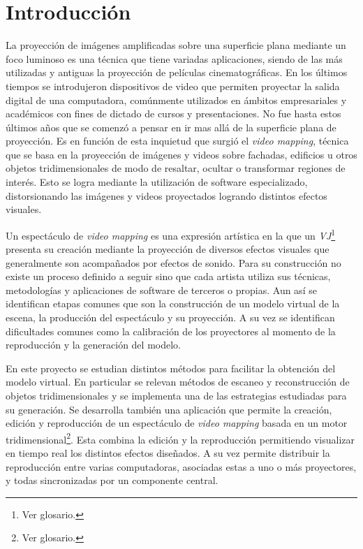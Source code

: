 ﻿\chapter{Introducción}


La proyección de imágenes amplificadas sobre una superficie plana mediante un foco luminoso es una técnica que tiene variadas aplicaciones, siendo de las más utilizadas y antiguas la proyección de películas cinematográficas. En los últimos tiempos se introdujeron dispositivos de video que permiten proyectar la salida digital de una computadora, comúnmente utilizados en ámbitos empresariales y académicos con fines de dictado de cursos y presentaciones. No fue hasta estos últimos años que se comenzó a pensar en ir mas allá de la superficie plana de proyección. Es en función de esta inquietud que surgió el \emph{video mapping}, técnica que se basa en la proyección de imágenes y videos sobre fachadas, edificios u otros objetos tridimensionales de modo de resaltar, ocultar o transformar regiones de interés. Esto se logra mediante la utilización de software especializado, distorsionando las imágenes y videos proyectados logrando distintos efectos visuales.

Un espectáculo de \emph{video mapping} es una expresión artística en la que un \emph{VJ}\footnote{Ver glosario.} presenta su creación mediante la proyección de diversos efectos visuales que generalmente son acompañados por efectos de sonido. Para su construcción no existe un proceso definido a seguir sino que cada artista utiliza sus técnicas, metodologías y aplicaciones de software de terceros o propias. Aun así se identifican etapas comunes que son la construcción de un modelo virtual de la escena, la producción del espectáculo y su proyección. A su vez se identifican dificultades comunes como la calibración de los proyectores al momento de la reproducción y la generación del modelo.

En este proyecto se estudian distintos métodos para facilitar la obtención del modelo virtual. En particular se relevan métodos de escaneo y reconstrucción de objetos tridimensionales y se implementa una de las estrategias estudiadas para su generación.
Se desarrolla también una aplicación que permite la creación, edición y reproducción de un espectáculo de \emph{video mapping} basada en un motor tridimensional\footnote{Ver glosario.}. Esta combina la edición y la reproducción permitiendo visualizar en tiempo real los distintos efectos diseñados. A su vez permite distribuir la reproducción entre varias computadoras, asociadas estas a uno o más proyectores, y todas sincronizadas por un componente central.

